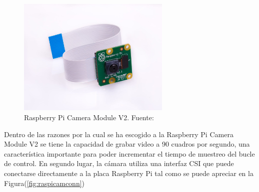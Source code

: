         \begin{figure}[!h] 
            \centering
            \includegraphics[width=0.65\textwidth]{img/raspicam}
            \caption[Raspberry Pi Camera Module V2]{Raspberry Pi Camera Module V2. Fuente: \cite{raspicam} }
            \label{fig:raspicam}
        \end{figure}

        \begin{table}[!h]
            \centering
            \caption[Características de la Raspberry Pi Camera Module V2.]{Características de la Raspberry Pi Camera Module V2. Fuente: \cite{raspicam}}
            \label{tbl:raspicamspecs}
            \end{table}
        
        Dentro de las razones por la cual se ha escogido a la Raspberry Pi Camera Module V2 se tiene la capacidad de 
        grabar video a 90 cuadros por segundo, una característica importante para poder incrementar el tiempo de muestreo del 
        bucle de control. En segundo lugar, la cámara utiliza una interfaz CSI que puede conectarse directamente a la placa Raspberry
        Pi tal como se puede apreciar en la Figura(\ref{fig:raspicamconn})
        
